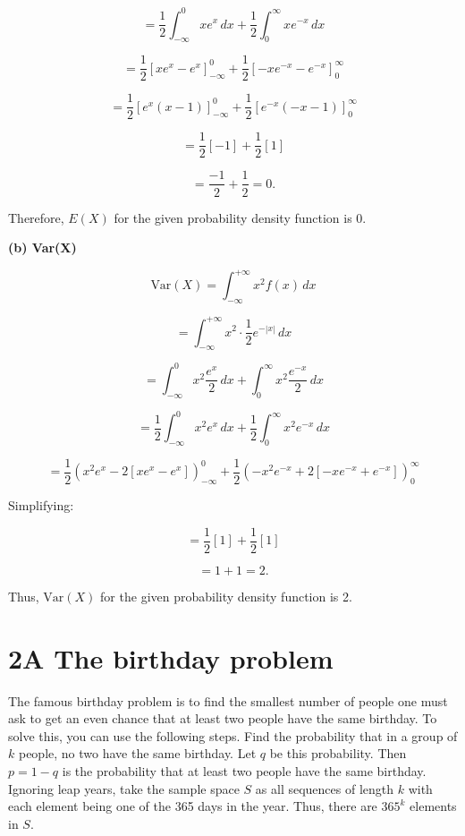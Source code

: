 \documentclass{article}
\begin{document}
\[
= \frac{1}{2} \int_{-\infty}^{0} x e^{x} \, dx + \frac{1}{2} \int_{0}^{\infty} x e^{-x} \, dx
\]

\[
= \frac{1}{2} \left[ x e^{x} - e^{x} \right]_{-\infty}^{0} + \frac{1}{2} \left[ - x e^{-x} - e^{-x} \right]_{0}^{\infty}
\]

\[
= \frac{1}{2} \left[ e^{x}(x-1) \right]_{-\infty}^{0} + \frac{1}{2} \left[ e^{-x}(-x-1) \right]_{0}^{\infty}
\]

\[
= \frac{1}{2} \left[ -1 \right] + \frac{1}{2} \left[ 1 \right]
\]

\[
= \frac{-1}{2} + \frac{1}{2} = 0.
\]

Therefore, \( E(X) \) for the given probability density function is 0.

\textbf{(b) Var(X)}

\[
\text{Var}(X) = \int_{-\infty}^{+\infty} x^2 f(x) \, dx
\]

\[
= \int_{-\infty}^{+\infty} x^2 \cdot \frac{1}{2} e^{-|x|} \, dx
\]

\[
= \int_{-\infty}^{0} x^2 \frac{e^{x}}{2} \, dx + \int_{0}^{\infty} x^2 \frac{e^{-x}}{2} \, dx
\]

\[
= \frac{1}{2} \int_{-\infty}^{0} x^2 e^{x} \, dx + \frac{1}{2} \int_{0}^{\infty} x^2 e^{-x} \, dx
\]

\[
= \frac{1}{2} \left( x^2 e^{x} - 2 \left[ x e^{x} - e^{x} \right] \right)_{-\infty}^{0} + \frac{1}{2} \left( -x^2 e^{-x} + 2 \left[ -x e^{-x} + e^{-x} \right] \right)_{0}^{\infty}
\]

Simplifying:

\[
= \frac{1}{2} \left[ 1 \right] + \frac{1}{2} \left[ 1 \right]
\]

\[
= 1 + 1 = 2.
\]

Thus, \( \text{Var}(X) \) for the given probability density function is 2.



\section*{2A The birthday problem}

The famous birthday problem is to find the smallest number of people one must ask to get an even chance that at least two people have the same birthday. To solve this, you can use the following steps. Find the probability that in a group of \( k \) people, no two have the same birthday. Let \( q \) be this probability. Then \( p = 1 - q \) is the probability that at least two people have the same birthday. Ignoring leap years, take the sample space \( S \) as all sequences of length \( k \) with each element being one of the 365 days in the year. Thus, there are \( 365^k \) elements in \( S \).
\end{document}
